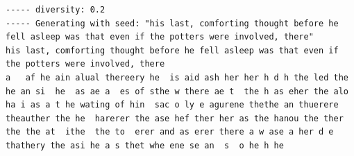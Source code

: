 \documentclass{article}[]
\begin{document}
\begin{lstlisting}[label=gru-harry-all-low-diverse, caption={GRU Harry Potter after 60 epochs, diversity=0.2}]
----- diversity: 0.2
----- Generating with seed: "his last, comforting thought before he fell asleep was that even if the potters were involved, there"
his last, comforting thought before he fell asleep was that even if the potters were involved, there
a   af he ain alual thereery he  is aid ash her her h d h the led the he an si  he  as ae a  es of sthe w there ae t  the h as eher the alo ha i as a t he wating of hin  sac o ly e agurene thethe an thuerere theauther the he  harerer the ase hef ther her as the hanou the ther the the at  ithe  the to  erer and as erer there a w ase a her d e thathery the asi he a s thet whe ene se an  s  o he h he
\end{lstlisting}


 

\end{document}
